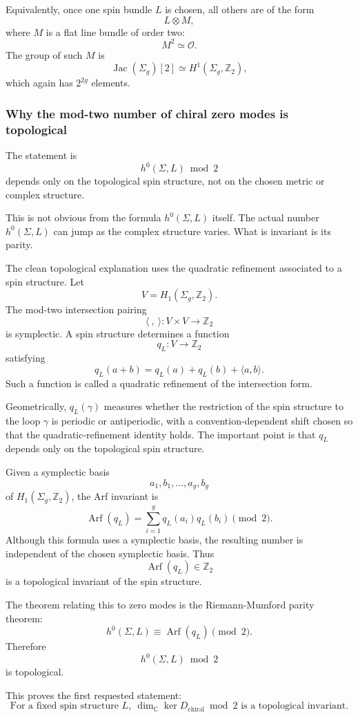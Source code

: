 \documentclass[
  10pt,
  a4paper,
  openany]{book}
\begin{document}
Equivalently, once one spin bundle \(L\) is chosen, all others are of
the form \[
L\otimes M,
\] where \(M\) is a flat line bundle of order two: \[
M^2\simeq \mathcal O.
\] The group of such \(M\) is \[
\operatorname{Jac}(\Sigma_g)[2]\simeq H^1(\Sigma_g,\mathbb Z_2),
\] which again has \(2^{2g}\) elements.

\subsubsection{Why the mod-two number of chiral zero modes is
topological}\label{why-the-mod-two-number-of-chiral-zero-modes-is-topological}

The statement is \[
h^0(\Sigma,L)\bmod 2
\] depends only on the topological spin structure, not on the chosen
metric or complex structure.

This is not obvious from the formula \(h^0(\Sigma,L)\) itself. The
actual number \(h^0(\Sigma,L)\) can jump as the complex structure
varies. What is invariant is its parity.

The clean topological explanation uses the quadratic refinement
associated to a spin structure. Let \[
V=H_1(\Sigma_g,\mathbb Z_2).
\] The mod-two intersection pairing \[
\langle\ ,\ \rangle:V\times V\to\mathbb Z_2
\] is symplectic. A spin structure determines a function \[
q_L:V\to\mathbb Z_2
\] satisfying \[
q_L(a+b)
=
q_L(a)+q_L(b)+\langle a,b\rangle.
\] Such a function is called a quadratic refinement of the intersection
form.

Geometrically, \(q_L(\gamma)\) measures whether the restriction of the
spin structure to the loop \(\gamma\) is periodic or antiperiodic, with
a convention-dependent shift chosen so that the quadratic-refinement
identity holds. The important point is that \(q_L\) depends only on the
topological spin structure.

Given a symplectic basis \[
a_1,b_1,\dots,a_g,b_g
\] of \(H_1(\Sigma_g,\mathbb Z_2)\), the Arf invariant is \[
\operatorname{Arf}(q_L)
=
\sum_{i=1}^g q_L(a_i)q_L(b_i)
\pmod 2.
\] Although this formula uses a symplectic basis, the resulting number
is independent of the chosen symplectic basis. Thus \[
\operatorname{Arf}(q_L)\in\mathbb Z_2
\] is a topological invariant of the spin structure.

The theorem relating this to zero modes is the Riemann-Mumford parity
theorem: \[
h^0(\Sigma,L)
\equiv
\operatorname{Arf}(q_L)
\pmod 2.
\] Therefore \[
h^0(\Sigma,L)\bmod 2
\] is topological.

This proves the first requested statement: \[
\boxed{
\text{For a fixed spin structure }L,\ 
\dim_{\mathbb C}\ker D_{\text{chiral}}\bmod 2
\text{ is a topological invariant.}
}
\]
\end{document}
